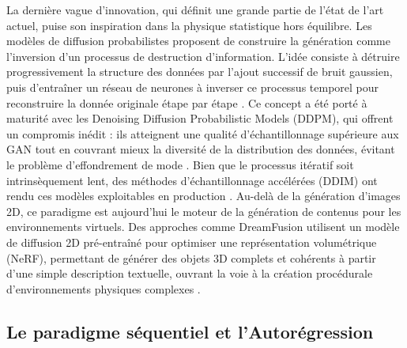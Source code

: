 La dernière vague d'innovation, qui définit une grande partie de l'état de l'art actuel, puise son inspiration dans la physique statistique hors équilibre. Les modèles de diffusion probabilistes proposent de construire la génération comme l'inversion d'un processus de destruction d'information. L'idée consiste à détruire progressivement la structure des données par l'ajout successif de bruit gaussien, puis d'entraîner un réseau de neurones à inverser ce processus temporel pour reconstruire la donnée originale étape par étape \cite{sohl-dickstein_deep_2015}. Ce concept a été porté à maturité avec les Denoising Diffusion Probabilistic Models (DDPM), qui offrent un compromis inédit : ils atteignent une qualité d'échantillonnage supérieure aux GAN tout en couvrant mieux la diversité de la distribution des données, évitant le problème d'effondrement de mode \cite{ho_denoising_2020}.
Bien que le processus itératif soit intrinsèquement lent, des méthodes d'échantillonnage accélérées (DDIM) ont rendu ces modèles exploitables en production \cite{song_denoising_2022}. Au-delà de la génération d'images 2D, ce paradigme est aujourd'hui le moteur de la génération de contenus pour les environnements virtuels. Des approches comme DreamFusion utilisent un modèle de diffusion 2D pré-entraîné pour optimiser une représentation volumétrique (NeRF), permettant de générer des objets 3D complets et cohérents à partir d'une simple description textuelle, ouvrant la voie à la création procédurale d'environnements physiques complexes \cite{poole_dreamfusion_2022}.


\subsection{Le paradigme séquentiel et l'Autorégression}

